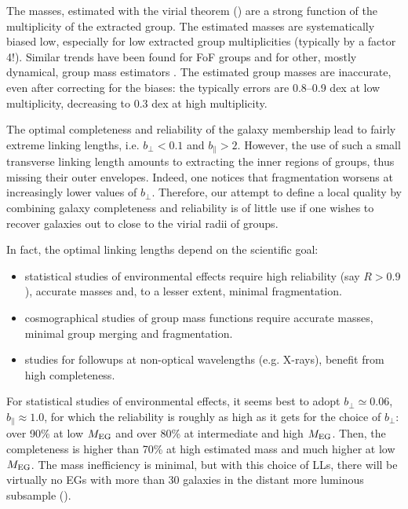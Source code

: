 The masses, estimated with the virial theorem () are a
strong function of the multiplicity of the extracted group. The estimated
masses are systematically biased low, especially for low extracted group
multiplicities (typically by a factor 4!). Similar trends have been found for
FoF groups \citep{Robotham+11} and for other, mostly dynamical, group mass
estimators \citep{Old+14}. The estimated group masses are inaccurate, even
after correcting for the biases: the typically errors are 0.8--0.9 dex at low
multiplicity, decreasing to 0.3 dex at high multiplicity.

The optimal completeness and reliability of the galaxy membership lead to
fairly extreme linking lengths, i.e. $b_\perp < 0.1$ and $b_\parallel > 2$.
However, the use of such a small transverse linking length amounts to
extracting the inner regions of groups, thus missing their outer envelopes.
Indeed, one notices that fragmentation worsens at increasingly lower values of
$b_\perp$. Therefore, our attempt to define a local quality by combining galaxy
completeness and reliability is of little use if one wishes to recover galaxies
out to close to the virial radii of groups.

In fact, the optimal linking lengths depend on the scientific goal:
%
\begin{itemize}
    \item statistical studies of environmental effects require high reliability
        (say $R>  0.9$), accurate masses and, to a lesser extent, minimal
        fragmentation.
    \item cosmographical studies of group mass functions require accurate
        masses, minimal group merging and fragmentation.
    \item studies for followups at non-optical wavelengths (e.g. X-rays),
        benefit from high completeness.
\end{itemize}

For statistical studies of environmental effects, it seems best to adopt
$b_\perp \simeq 0.06$, $b_\parallel \approx 1.0$, for which the reliability is
roughly as high as it gets for the choice of $b_\perp$: over 90\% at low
$M_{\rm EG}$ and over 80\% at intermediate and high $M_{\rm EG}$. Then,  the
completeness is higher than 70\% at high estimated mass and much higher at low
$M_{\rm EG}$. The mass inefficiency is minimal, but with this choice of LLs,
there will be virtually no EGs with more than 30 galaxies in the distant more
luminous subsample ().

